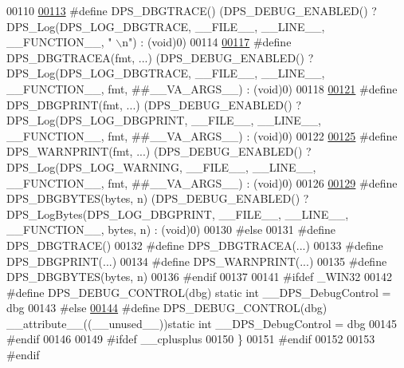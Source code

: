 \begin{DoxyCode}
00110 
\hyperlink{group__debug_ga0a4156dc81e39b0cf2fb251e37bda307}{00113} \textcolor{preprocessor}{#define DPS\_DBGTRACE() (DPS\_DEBUG\_ENABLED() ? DPS\_Log(DPS\_LOG\_DBGTRACE, \_\_FILE\_\_, \_\_LINE\_\_, \_\_FUNCTION\_\_, "
      \(\backslash\)n") : (void)0)}
00114 
\hyperlink{group__debug_ga62bb2ddb60beb7390755a19cd7874b5c}{00117} \textcolor{preprocessor}{#define DPS\_DBGTRACEA(fmt, ...) (DPS\_DEBUG\_ENABLED() ? DPS\_Log(DPS\_LOG\_DBGTRACE, \_\_FILE\_\_, \_\_LINE\_\_,
       \_\_FUNCTION\_\_, fmt, ##\_\_VA\_ARGS\_\_) : (void)0)}
00118 
\hyperlink{group__debug_ga7ac5236c2ba157ffcf56cd073dcf0c3f}{00121} \textcolor{preprocessor}{#define DPS\_DBGPRINT(fmt, ...) (DPS\_DEBUG\_ENABLED() ? DPS\_Log(DPS\_LOG\_DBGPRINT, \_\_FILE\_\_, \_\_LINE\_\_,
       \_\_FUNCTION\_\_, fmt, ##\_\_VA\_ARGS\_\_) : (void)0)}
00122 
\hyperlink{group__debug_ga37ab9dbe492fd9f7b78349f6e789e5f2}{00125} \textcolor{preprocessor}{#define DPS\_WARNPRINT(fmt, ...) (DPS\_DEBUG\_ENABLED() ? DPS\_Log(DPS\_LOG\_WARNING, \_\_FILE\_\_, \_\_LINE\_\_,
       \_\_FUNCTION\_\_, fmt, ##\_\_VA\_ARGS\_\_) : (void)0)}
00126 
\hyperlink{group__debug_ga170843b022fc7bc00bf871eb5189fe52}{00129} \textcolor{preprocessor}{#define DPS\_DBGBYTES(bytes, n) (DPS\_DEBUG\_ENABLED() ? DPS\_LogBytes(DPS\_LOG\_DBGPRINT, \_\_FILE\_\_, \_\_LINE\_\_,
       \_\_FUNCTION\_\_, bytes, n) : (void)0)}
00130 \textcolor{preprocessor}{#else}
00131 \textcolor{preprocessor}{#define DPS\_DBGTRACE()}
00132 \textcolor{preprocessor}{#define DPS\_DBGTRACEA(...)}
00133 \textcolor{preprocessor}{#define DPS\_DBGPRINT(...)}
00134 \textcolor{preprocessor}{#define DPS\_WARNPRINT(...)}
00135 \textcolor{preprocessor}{#define DPS\_DBGBYTES(bytes, n)}
00136 \textcolor{preprocessor}{#endif}
00137 
00141 \textcolor{preprocessor}{#ifdef \_WIN32}
00142 \textcolor{preprocessor}{#define DPS\_DEBUG\_CONTROL(dbg) static int \_\_DPS\_DebugControl = dbg}
00143 \textcolor{preprocessor}{#else}
\hyperlink{group__debug_ga6990490017f384ce2d462e1b5c0963b8}{00144} \textcolor{preprocessor}{#define DPS\_DEBUG\_CONTROL(dbg) \_\_attribute\_\_((\_\_unused\_\_))static int \_\_DPS\_DebugControl = dbg}
00145 \textcolor{preprocessor}{#endif}
00146 
00149 \textcolor{preprocessor}{#ifdef \_\_cplusplus}
00150 \}
00151 \textcolor{preprocessor}{#endif}
00152 
00153 \textcolor{preprocessor}{#endif}
\end{DoxyCode}
